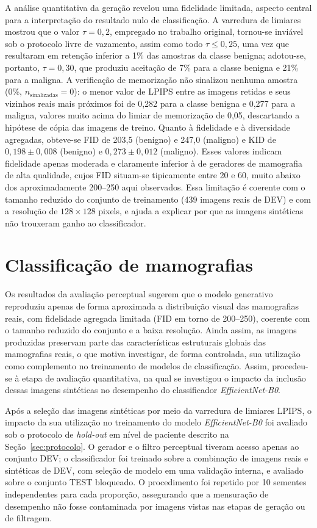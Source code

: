 \documentclass[
	12pt,				%
	openright,			%
	oneside,			%
	a4paper,			%
	tcc,			%
	]{ABNT-DC-UEL}
\begin{document}
A análise quantitativa da geração revelou uma fidelidade limitada, aspecto central para a interpretação do resultado nulo de classificação. A varredura de limiares mostrou que o valor $\tau = 0{,}2$, empregado no trabalho original, tornou-se inviável sob o protocolo livre de vazamento, assim como todo $\tau \le 0{,}25$, uma vez que resultaram em retenção inferior a 1\% das amostras da classe benigna; adotou-se, portanto, $\tau = 0{,}30$, que produziu aceitação de 7\% para a classe benigna e 21\% para a maligna. A verificação de memorização não sinalizou nenhuma amostra (0\%, $n_{\text{sinalizadas}} = 0$): o menor valor de LPIPS entre as imagens retidas e seus vizinhos reais mais próximos foi de 0,282 para a classe benigna e 0,277 para a maligna, valores muito acima do limiar de memorização de 0,05, descartando a hipótese de cópia das imagens de treino. Quanto à fidelidade e à diversidade agregadas, obteve-se FID de 203,5 (benigno) e 247,0 (maligno) e KID de $0{,}198 \pm 0{,}008$ (benigno) e $0{,}273 \pm 0{,}012$ (maligno). Esses valores indicam fidelidade apenas moderada e claramente inferior à de geradores de mamografia de alta qualidade, cujos FID situam-se tipicamente entre 20 e 60, muito abaixo dos aproximadamente 200--250 aqui observados. Essa limitação é coerente com o tamanho reduzido do conjunto de treinamento (439 imagens reais de DEV) e com a resolução de $128 \times 128$ pixels, e ajuda a explicar por que as imagens sintéticas não trouxeram ganho ao classificador.

\section{Classificação de mamografias}

Os resultados da avaliação perceptual sugerem que o modelo generativo reproduziu apenas de forma aproximada a distribuição visual das mamografias reais, com fidelidade agregada limitada (FID em torno de 200--250), coerente com o tamanho reduzido do conjunto e a baixa resolução. Ainda assim, as imagens produzidas preservam parte das características estruturais globais das mamografias reais, o que motiva investigar, de forma controlada, sua utilização como complemento no treinamento de modelos de classificação. Assim, procedeu-se à etapa de avaliação quantitativa, na qual se investigou o impacto da inclusão dessas imagens sintéticas no desempenho do classificador \textit{EfficientNet-B0}.

Após a seleção das imagens sintéticas por meio da varredura de limiares LPIPS, o impacto da sua utilização no treinamento do modelo \textit{EfficientNet-B0} foi avaliado sob o protocolo de \textit{hold-out} em nível de paciente descrito na Seção~\ref{sec:protocolo}. O gerador e o filtro perceptual tiveram acesso apenas ao conjunto DEV; o classificador foi treinado sobre a combinação de imagens reais e sintéticas de DEV, com seleção de modelo em uma validação interna, e avaliado sobre o conjunto TEST bloqueado. O procedimento foi repetido por 10 sementes independentes para cada proporção, assegurando que a mensuração de desempenho não fosse contaminada por imagens vistas nas etapas de geração ou de filtragem.
\end{document}
